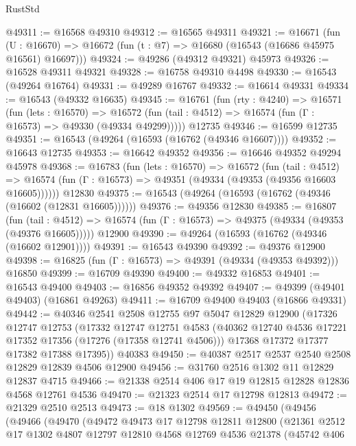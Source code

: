 \begin{lexlean}{RustStd}
\begin{coremodule}
@49311 := @16568 @49310
@49312 := @16565 @49311
@49321 := @16671
    (fun (U : @16670) => @16672 (fun (t : @7) => @16680 (@16543 (@16686 @45975 @16561) @16697)))
@49324 := @49286 (@49312 @49321) @45973
@49326 := @16528 @49311 @49321
@49328 := @16758 @49310 @4498
@49330 := @16543 (@49264 @16764)
@49331 := @49289 @16767
@49332 := @16614 @49331
@49334 := @16543 (@49332 @16635)
@49345 := @16761
    (fun (rty : @4240) =>
    @16571
      (fun (lets : @16570) =>
      @16572 (fun (tail : @4512) => @16574 (fun (Γ : @16573) => @49330 (@49334 @49299)))))
    @12735
@49346 := @16599 @12735
@49351 := @16543 (@49264 (@16593 (@16762 (@49346 @16607))))
@49352 := @16643 @12735
@49353 := @16642 @49352
@49356 := @16646 @49352 @49294 @45978
@49368 := @16783
    (fun (lets : @16570) =>
    @16572
      (fun (tail : @4512) =>
      @16574 (fun (Γ : @16573) => @49351 (@49334 (@49353 (@49356 @16603 @16605))))))
    @12830
@49375 := @16543 (@49264 (@16593 (@16762 (@49346 (@16602 (@12831 @16605))))))
@49376 := @49356 @12830
@49385 := @16807
    (fun (tail : @4512) => @16574 (fun (Γ : @16573) => @49375 (@49334 (@49353 (@49376 @16605)))))
    @12900
@49390 := @49264 (@16593 (@16762 (@49346 (@16602 @12901))))
@49391 := @16543 @49390
@49392 := @49376 @12900
@49398 := @16825 (fun (Γ : @16573) => @49391 (@49334 (@49353 @49392))) @16850
@49399 := @16709 @49390
@49400 := @49332 @16853
@49401 := @16543 @49400
@49403 := @16856 @49352 @49392
@49407 := @49399 (@49401 @49403) (@16861 @49263)
@49411 := @16709 @49400 @49403 (@16866 @49331)
@49442 := @40346
    @2541
    @2508
    @12755
    @97
    @5047
    @12829
    @12900
    (@17326
      @12747
      @12753
      (@17332
        @12747
        @12751
        @4583
        (@40362 @12740 @4536 @17221 @17352 @17356 (@17276 (@17358 @12741 @4506)))
        @17368
        @17372
        @17377
        @17382
        @17388
        @17395))
    @40383
@49450 := @40387 @2517 @2537 @2540 @2508 @12829 @12839 @4506 @12900
@49456 := @31760 @2516 @1302 @11 @12829 @12837 @4715
@49466 := @21338 @2514 @406 @17 @19 @12815 @12828 @12836 @4568 @12761 @4536
@49470 := @21323 @2514 @17 @12798 @12813
@49472 := @21329 @2510 @2513
@49473 := @18 @1302
@49569 := @49450
    (@49456
      (@49466
        (@49470
          (@49472
            @49473
            @17
            @12798
            @12811
            @12800
            (@21361
              @2512
              @17
              @1302
              @4807
              @12797
              @12810
              @4568
              @12769
              @4536
              @21378
              (@45742
                @406

\end{coremodule}
\end{lexlean}
